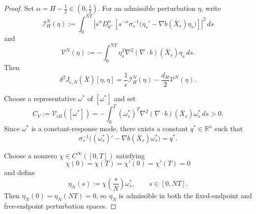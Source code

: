 \documentclass[preprint,12pt]{elsarticle}
\theoremstyle{definition}
\theoremstyle{plain}
\begin{document}
\begin{proof}
Set $\alpha=H-\frac12\in(0,\frac12)$. For an admissible perturbation
$\eta$, write
\begin{equation}
\label{eq:IHN-def-H-greater-half}
    \mathcal I_H^N(\eta)
    :=
    \int_0^{NT}
    \left|
        s^\alpha D_{0^+}^{\alpha}
        \left[
            s^{-\alpha}\sigma_s^{-1}
            \bigl(
                \eta_s'
                -
                \nabla b(\bar X_s)\eta_s
            \bigr)
        \right]
    \right|^2\,ds
\end{equation}
and
\begin{equation}
\label{eq:VN-def-H-greater-half}
    \mathcal V^N(\eta)
    :=
    -
    \int_0^{NT}
    \eta_s^T
    \nabla^2(\nabla\!\cdot b)(\bar X_s)
    \eta_s\,ds.
\end{equation}
Then
\begin{equation*}
    \delta^2J_{\epsilon,N}(\bar X)[\eta,\eta]
    =
    \frac1\epsilon\mathcal I_H^N(\eta)
    -
    \frac{d_H}{2}\mathcal V^N(\eta).
\end{equation*}

Choose a representative $\omega^*$ of $[\omega^*]$ and set
\begin{equation}
\label{eq:positive-Veff}
    C_V
    :=
    \mathcal V_{\mathrm{eff}}([\omega^*])
    =
    -
    \int_0^T
    (\omega_s^*)^T
    \nabla^2(\nabla\!\cdot b)(\bar X_s)
    \omega_s^*\,ds
    >
    0.
\end{equation}
Since $\omega^*$ is a constant-response mode, there exists a constant
$q^*\in\mathbb R^n$ such that
\begin{equation}
\label{eq:constant-response-selected}
    \sigma_s^{-1}
    \bigl(
        (\omega_s^*)'
        -
        \nabla b(\bar X_s)\omega_s^*
    \bigr)
    =
    q^*.
\end{equation}

Choose a nonzero $\chi\in C^\infty([0,T])$ satisfying
\begin{equation*}
    \chi(0)=\chi(T)=\chi'(0)=\chi'(T)=0
\end{equation*}
and define
\begin{equation}
\label{eq:test-variation-etaN}
    \eta_N(s)
    :=
    \chi\left(\frac{s}{N}\right)\omega_s^*,
    \qquad
    s\in[0,NT].
\end{equation}
Then $\eta_N(0)=\eta_N(NT)=0$, so $\eta_N$ is admissible in both the
fixed-endpoint and free-endpoint perturbation spaces.


\end{proof}
\end{document}
